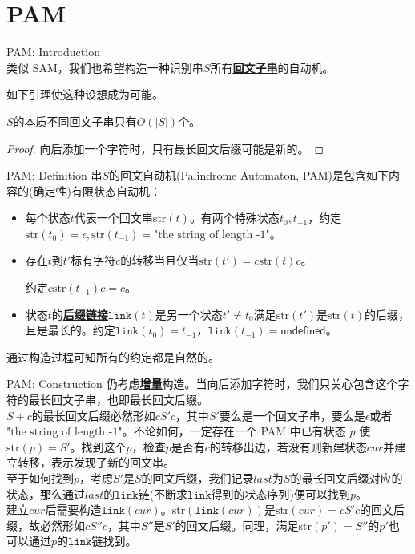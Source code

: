 \documentclass{beamer}
\theoremstyle{compact}
\def\obj#1{\textbf{\uline{#1}}}
\def\link{\texttt{link}}
\begin{document}
\section{PAM}
\begin{frame}{PAM: Introduction}
	~\\

	类似 SAM，我们也希望构造一种识别串$S$所有\obj{回文子串}的自动机。
	
	如下引理使这种设想成为可能。
	\begin{lemma}
		$S$的本质不同回文子串只有$O(|S|)$个。
	\end{lemma}\pause
	\begin{proof}
		向后添加一个字符时，只有最长回文后缀可能是新的。
	\end{proof}
\end{frame}
\begin{frame}{PAM: Definition}
	串$S$的回文自动机(Palindrome Automaton, PAM)是包含如下内容的(确定性)有限状态自动机：
	\begin{itemize}
		\item 每个状态$t$代表一个回文串$\mathrm{str}(t)$。有两个特殊状态$t_0, t_{-1}$，约定$\mathrm{str}(t_0) = \epsilon, \mathrm{str}(t_{-1}) = \textrm{"the string of length -1"}$。
		\item 存在$t$到$t'$标有字符$c$的转移当且仅当$\mathrm{str}(t') = c\mathrm{str}(t)c$。
		
		约定$c\mathrm{str}(t_{-1})c = c$。
		\item 状态$t$的\obj{后缀链接}$\link(t)$是另一个状态$t' \neq t_0$满足$\mathrm{str}(t')$是$\mathrm{str}(t)$的后缀，且是最长的。约定$\link(t_0) = t_{-1}$，$\link(t_{-1}) = \textsf{undefined}$。
	\end{itemize}

	通过构造过程可知所有的约定都是自然的。
\end{frame}
\begin{frame}{PAM: Construction}
	仍考虑\obj{增量}构造。当向后添加字符时，我们只关心包含这个字符的最长回文子串，也即最长回文后缀。\\

	$S+c$的最长回文后缀必然形如$cS'c$，其中$S'$要么是一个回文子串，要么是$\epsilon$或者$\textrm{"the string of length -1"}$。不论如何，一定存在一个 PAM 中已有状态 $p$ 使 $\mathrm{str}(p) = S'$。找到这个$p$，检查$p$是否有$c$的转移出边，若没有则新建状态$cur$并建立转移，表示发现了新的回文串。\\

	至于如何找到$p$，考虑$S'$是$S$的回文后缀，我们记录$last$为$S$的最长回文后缀对应的状态，那么通过$last$的$\link$链(不断求$\link$得到的状态序列)便可以找到$p$。\\

	建立$cur$后需要构造$\link(cur)$。$\mathrm{str}(\link(cur))$是$\mathrm{str}(cur) = cS'c$的回文后缀，故必然形如$cS''c$，其中$S''$是$S'$的回文后缀。同理，满足$\mathrm{str}(p') = S''$的$p'$也可以通过$p$的$\link$链找到。

\end{frame}
\end{document}
